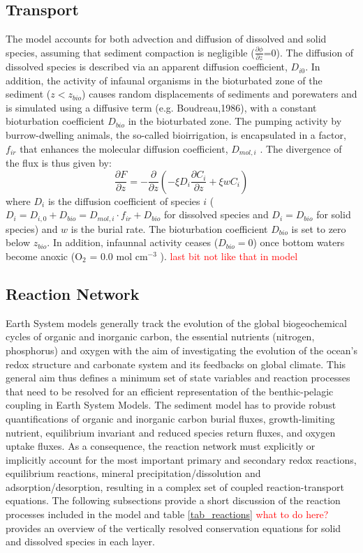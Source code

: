 \documentclass[gmd, manuscript]{copernicus}
\begin{document}
\subsection{Transport}
The model accounts for both advection and diffusion of dissolved and solid species, assuming that sediment compaction is negligible ($\frac{\partial \phi}{\partial z}$=0). 
The diffusion of dissolved species is described via an apparent diffusion coefficient, $D_{i0}$. In addition, the activity of infaunal organisms in the bioturbated zone of the sediment ($z<z_{bio}$) causes random 
displacements of sediments and porewaters and is simulated using a diffusive term (e.g. Boudreau,1986), with a constant bioturbation coefficient $D_{bio}$ in the bioturbated zone. 
The pumping activity by burrow-dwelling animals, the so-called bioirrigation, is encapsulated in a factor, $f_{ir}$ that enhances the molecular diffusion coefficient, 
$D_{mol,i}$ \citep[ hence, $D_{i,0}=D_{mol,i}\cdot f_{ir}$,][]{soetaert1996dynamic}.  The divergence of the flux is thus given by:
\begin{equation}
\frac{\partial F}{\partial z}=-\frac{\partial}{\partial z}\left( -\xi D_i \frac{\partial C_i}{\partial z} +\xi w C_i\right) \label{Eq_flux_divergence}
\end{equation}
where $D_i$ is the diffusion coefficient of species $i$ ($D_i=D_{i,0}+D_{bio}=D_{mol,i}\cdot f_{ir}+D_{bio}$ for dissolved species and $D_i=D_{bio}$ for solid species) and $w$ is the burial rate. 
The bioturbation coefficient $D_{bio}$ is set to zero below $z_{bio}$. In addition, infaunnal activity ceases ($D_{bio}=0$) once bottom waters become anoxic (O$_2$ = 0.0 mol cm$^{-3}$ ). 
\textcolor{red}{last bit not like that in model}


\subsection{Reaction Network}
Earth System models generally track the evolution of the global biogeochemical cycles of organic and inorganic carbon, the essential nutrients (nitrogen, phosphorus) and oxygen with the aim of investigating the evolution 
of the ocean's redox structure and carbonate system and its feedbacks on global climate. This general aim thus defines a minimum set of state variables and reaction processes that need to be resolved for an efficient 
representation of the benthic-pelagic coupling in Earth System Models. The sediment model has to provide robust quantifications of organic and inorganic carbon burial fluxes, growth-limiting nutrient, equilibrium invariant 
and reduced species return fluxes, and oxygen uptake fluxes. As a consequence, the reaction network must explicitly or implicitly account for the most important primary and secondary redox reactions, equilibrium reactions, 
mineral precipitation/dissolution and adsorption/desorption, resulting in a complex set of coupled reaction-transport equations. The following 
subsections provide a short discussion of the reaction processes included in the model and table \ref{tab_reactions} \textcolor{red}{what to do here?} provides an overview of the vertically resolved conservation equations for solid and dissolved species 
in each layer.
\end{document}

